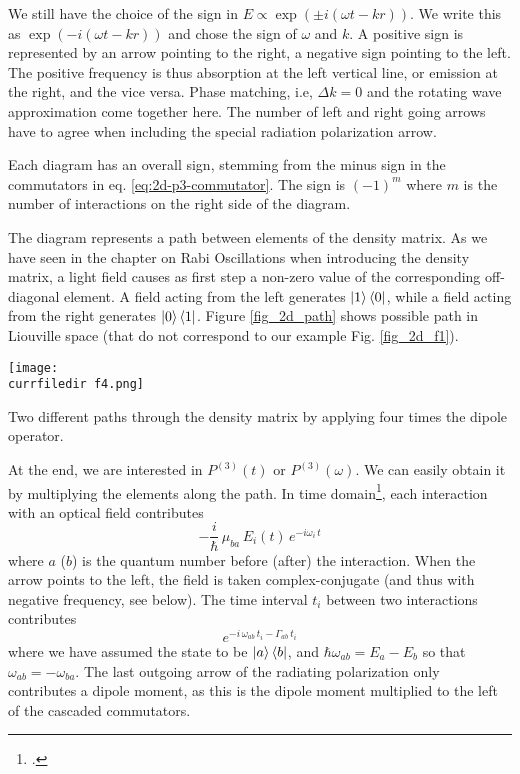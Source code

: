 We still have the choice of the sign in $E \propto \exp( \pm i (\omega t - k r) )$. We write this as  $\exp(- i (\omega t - k r) )$ and chose the sign of $\omega$ and $k$.
A positive sign is represented by an arrow pointing to the right, a negative sign pointing to the left. The positive frequency is thus absorption at the left vertical line, or emission at the right, and the vice versa. Phase matching, i.e, $\Delta k = 0$ and the rotating wave approximation come together here. The number of left and right going arrows have to agree when including the special radiation polarization arrow.

Each diagram has an overall sign, stemming from the minus sign in the commutators in eq. \ref{eq:2d-p3-commutator}. The sign is $(-1)^m$ where $m$ is the number of interactions on the right side of the diagram.

The diagram represents a path between elements of the density matrix. As we have seen in the chapter on Rabi Oscillations when introducing the density matrix, a light field causes as first step a non-zero value of the corresponding off-diagonal element. A field acting from the left generates $\ket{1} \bra{0}$, while a field acting from the right generates $\ket{0} \bra{1}$. Figure \ref{fig_2d_path} shows possible path in Liouville space (that do not correspond to our example Fig. \ref{fig_2d_f1}).

\begin{marginfigure}
\texttt{[image: \\currfiledir f4.png]}
\caption{
Two different paths  through the density matrix by applying four times the dipole operator.}
\label{fig_2d_path}
\end{marginfigure}

At the end, we are interested in $P^{(3)}(t)$ or $P^{(3)}(\omega)$. We can easily obtain it by multiplying the elements along the path. In time domain\footcite{Mukamel1995,HammZanni2011,Hamm-dummies}, each interaction with an optical field contributes
\begin{equation}
 - \frac{i}{\hbar} \, \mu_{ba} \, E_i(t)  \, e^{-i \omega_i \, t}
\end{equation}
where $a$ ($b$) is the quantum number before (after) the interaction. When the arrow points to the left, the field is taken complex-conjugate (and thus with negative frequency, see below). The time interval $t_i$ between two interactions contributes 
%
\begin{equation}
 e^{-i \, \omega_{ab} \, t_i - \Gamma_{ab} \, t_i}
\end{equation}
%
where we have assumed the state to be $\ket{a} \bra{b}$, and 
$\hbar \omega_{ab} = E_a - E_b$ so that $\omega_{ab}  = - \omega_{ba} $. The last outgoing arrow of the radiating polarization only contributes a dipole moment, as this is the dipole moment multiplied to the left of the cascaded commutators.

